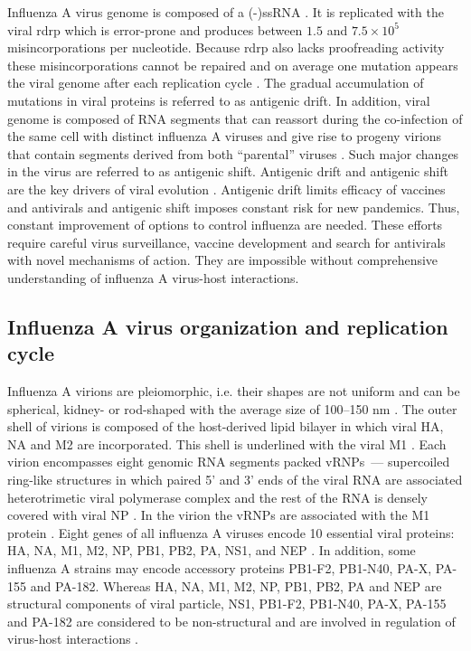 	Influenza A virus genome is composed of a \gls{(-)ssRNA} \parencite{Palese1977}. It is replicated with the viral \gls{rdrp} which is error-prone and produces between $1.5$ and $7.5\times10^5$ misincorporations per nucleotide. Because \gls{rdrp} also lacks proofreading activity these misincorporations cannot be repaired and on average one mutation appears the viral genome after each replication cycle \parencite{Drake1993, Parvin1986}. The gradual accumulation of mutations in viral proteins is referred to as antigenic drift. In addition, viral genome is composed of RNA segments that 
	can reassort during the co-infection of the same cell with distinct influenza A viruses and give rise to progeny virions that contain segments derived from both ``parental'' viruses \parencite{McGeoch1976, Desselberger1978}. Such major changes in the virus are referred to as antigenic shift. Antigenic drift and antigenic shift are the key drivers of viral evolution \parencite{Forrest2010}. Antigenic drift limits efficacy of vaccines and  antivirals and antigenic shift imposes constant risk for new pandemics. Thus, constant improvement of options to control influenza are needed. These efforts require careful virus surveillance, vaccine development and search for antivirals with novel mechanisms of action. They are impossible without comprehensive understanding of influenza A virus-host interactions.
	
\subsection{Influenza A virus organization and replication cycle}

	Influenza A virions are pleiomorphic, i.e. their shapes are not uniform and can be spherical, kidney- or rod-shaped with the average size of 100--150 nm \parencite{Fujiyoshi1994}. The outer shell of  virions is composed of the host-derived lipid bilayer in which viral \gls{HA}, \gls{NA} and \gls{M2} are incorporated. This shell is underlined with the viral \gls{M1} \parencite{Harris2006}. Each virion encompasses eight genomic RNA segments packed \glspl{vRNP}~--- supercoiled ring-like structures in which paired 5' and 3' ends of the viral RNA are associated heterotrimetic viral polymerase complex and the rest of the RNA is densely covered with viral \gls{NP} \parencite{Arranz2012}. In the virion the \glspl{vRNP} are associated with the \gls{M1} protein \parencite{Rees1982, Ye1999}. Eight genes of all influenza A viruses encode 10 essential viral proteins: \gls{HA}, \gls{NA}, \gls{M1}, \gls{M2}, \gls{NP}, \gls{PB1}, \gls{PB2}, \gls{PA}, \gls{NS1}, and \gls{NEP} \parencite{Lamb1983}. In addition, some influenza A strains may encode accessory proteins PB1-F2, PB1-N40, PA-X, PA-155 and PA-182. Whereas \gls{HA}, \gls{NA}, \gls{M1}, \gls{M2}, \gls{NP}, \gls{PB1}, \gls{PB2}, \gls{PA} and \gls{NEP} are structural components of viral particle, \gls{NS1}, PB1-F2, PB1-N40, PA-X, PA-155 and PA-182 are considered to be non-structural and are involved in regulation of virus-host interactions \parencite{Chen2001,Hale2008b,Wise2009,Jagger2012,Muramoto2013}.
	
